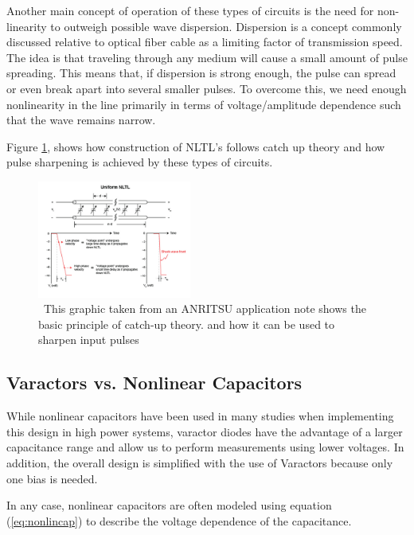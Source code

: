 \documentclass[journal]{IEEEtran} \usepackage[english]{babel}
\begin{document}
Another main concept of operation of these types of circuits is the need for
non-linearity to outweigh possible wave dispersion. Dispersion is a concept
commonly discussed relative to optical fiber cable as a limiting factor of
transmission speed. The idea is that traveling through any medium will cause a
small amount of pulse spreading. This means that, if dispersion is strong
enough, the pulse can spread or even break apart into several smaller pulses. To
overcome this, we need enough nonlinearity in the line primarily in terms of
voltage/amplitude dependence such that the wave remains narrow. 


Figure \ref{fig:shockline}\cite{shocklineNLTL}, shows how construction of NLTL's
follows catch up theory and how pulse sharpening is achieved by these types of
circuits. 



 \begin{figure}[htb]
\centering
\includegraphics[width=0.45\textwidth]{shockline_nltl_fig2.jpg}
\caption{\ This graphic taken from an ANRITSU application note shows the basic
principle of catch-up theory.
and how it can be used to sharpen input pulses}\label{fig:shockline}
\end{figure}

\subsection{Varactors vs. Nonlinear Capacitors}\label{sub:varacVSnonlincap}

While nonlinear capacitors have been used in many studies
\cite{FastHighVoltageNLTL} when implementing this design in high power systems,
varactor diodes have the advantage of a larger capacitance range and allow us
to perform measurements using lower voltages. In addition, the overall design is
simplified with the use of Varactors because only one bias is needed.

In any case, nonlinear capacitors are often modeled using equation
(\ref{eq:nonlincap}) to describe the voltage dependence of the
capacitance\cite{nikoo2018theory}.
\end{document}
